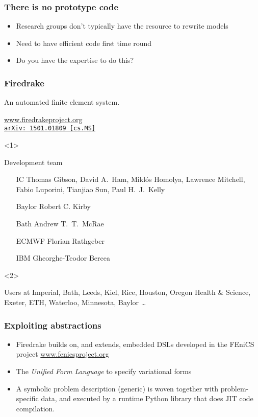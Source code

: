 \documentclass[presentation]{beamer}
\newcommand{\arxivlink}[2]{%
  \href{http://www.arxiv.org/abs/#1}%
  {{\small\texttt{arXiv:\,#1\,[#2]}}}%
}
\begin{document}
\begin{frame}
  \frametitle{There is no prototype code}
  \begin{itemize}
  \item Research groups don't typically have the resource to rewrite
    models
  \item Need to have efficient code first time round
  \item Do you have the expertise to do this?
  \end{itemize}
\end{frame}

\begin{frame}
  \frametitle{Firedrake}
  An automated finite element system.

  \begin{center}
    \url{www.firedrakeproject.org}\\
    \cite{Rathgeber:2016} \arxivlink{1501.01809}{cs.MS}
  \end{center}

  \begin{onlyenv}<1>
    \begin{block}{Development team}
      \begin{itemize}
      \item[IC] Thomas Gibson, David A.~Ham, Mikl\'os Homolya,
        Lawrence Mitchell, {\color{black!50}Fabio Luporini}, Tianjiao
        Sun, Paul H.~J.~Kelly
      \item[\color{black!75}Baylor] {\color{black!75}Robert C. Kirby}
      \item[\color{black!75}Bath] {\color{black!75}Andrew T.~T.~McRae}
      \item[\color{black!25}ECMWF] {\color{black!25}Florian Rathgeber}
      \item[\color{black!15}IBM] {\color{black!15}Gheorghe-Teodor Bercea}
      \end{itemize}
    \end{block}
  \end{onlyenv}
  \begin{onlyenv}<2>
    \begin{block}{Users at}
      Imperial, Bath, Leeds, Kiel, Rice, Houston, Oregon Health \&
      Science, Exeter, ETH, Waterloo, Minnesota, Baylor \dots
    \end{block}
  \end{onlyenv}
\end{frame}

\begin{frame}
  \frametitle{Exploiting abstractions}
  \begin{itemize}
  \item Firedrake builds on, and extends, embedded DSLs developed in
    the FEniCS project \url{www.fenicsproject.org}
  \item The \emph{Unified Form Language} \parencite{Alnaes:2014} to
    specify variational forms
  \item A symbolic problem description (generic) is woven together with
    problem-specific data, and executed by a runtime Python library
    that does JIT code compilation.
  \end{itemize}
\end{frame}
\end{document}
